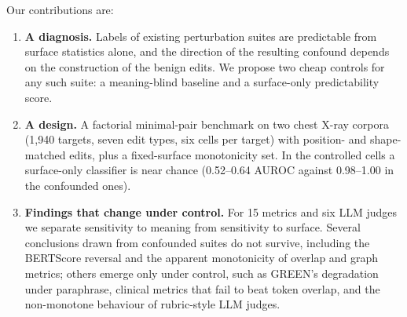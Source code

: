 \documentclass[11pt]{article}
\begin{document}
Our contributions are:
\begin{enumerate}[leftmargin=*,noitemsep]
\item \textbf{A diagnosis.} Labels of existing perturbation suites are predictable from surface statistics alone, and the direction of the resulting confound depends on the construction of the benign edits. We propose two cheap controls for any such suite: a meaning-blind baseline and a surface-only predictability score.
\item \textbf{A design.} A factorial minimal-pair benchmark on two chest X-ray corpora (1,940 targets, seven edit types, six cells per target) with position- and shape-matched edits, plus a fixed-surface monotonicity set. In the controlled cells a surface-only classifier is near chance (0.52--0.64 AUROC against 0.98--1.00 in the confounded ones).
\item \textbf{Findings that change under control.} For 15 metrics and six LLM judges we separate sensitivity to meaning from sensitivity to surface. Several conclusions drawn from confounded suites do not survive, including the BERTScore reversal and the apparent monotonicity of overlap and graph metrics; others emerge only under control, such as GREEN's degradation under paraphrase, clinical metrics that fail to beat token overlap, and the non-monotone behaviour of rubric-style LLM judges.
\end{enumerate}
\end{document}
